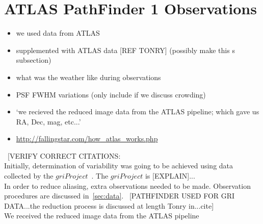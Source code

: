 \documentclass[aps,prb,twocolumn,superscriptaddress]{revtex4-1}
\begin{document}
\section{ATLAS PathFinder 1 Observations}
\begin{itemize}
	\item{} we used data from ATLAS
	\item{} supplemented with ATLAS data [REF TONRY] (possibly make this s subsection)
	\item{} what was the weather like during observations
	\item{} PSF FWHM variations (only include if we discuss crowding)
	\item{} `we recieved the reduced image data from the ATLAS pipeline; which gave us RA, Dec, mag, etc...'
	\item{}\url{http://fallingstar.com/how_atlas_works.php}
\end{itemize}


~[VERIFY CORRECT CITATIONS:\\%
Initially, determination of variability was going to be achieved using data collected by the $gri Project$~\cite{gri}.  The $gri Project$ is [EXPLAIN]...\\
In order to reduce aliasing, extra observations needed to be made.  Observation procedures are discussed in~\cref{sec:data}.
~[PATHFINDER USED FOR GRI DATA...the reduction process is discussed at length Tonry in...cite]\\
We received the reduced image data from the ATLAS pipeline~\cite{PSpipe}~\cite{tonrypipe}
\end{document}
